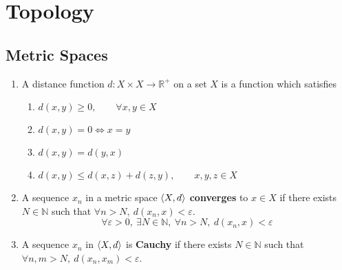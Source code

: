 \chapter{Topology}
\section{Metric Spaces}
\begin{enumerate}
	\item A distance function $d : X \times X \to \mathbb{R}^+$ on a set $X$ is a function which satisfies
	\begin{enumerate}
		\item $d(x,y) \ge 0,\qquad \forall x,y \in X$
		\item $d(x,y) = 0 \iff x=y$
		\item $d(x,y) = d(y,x)$
		\item $d(x,y) \le d(x,z) + d(z,y), \qquad x,y,z \in X$
	\end{enumerate}
	\item A sequence $x_n$ in a metric space $\left\langle X,d \right\rangle$ \textbf{converges} to $x \in X$ if there exists $N \in \mathbb{N}$ such that $\forall n > N,\ d(x_n,x) < \varepsilon$.
	$$ \forall \varepsilon > 0,\ \exists N \in \mathbb{N},\ \forall n > N,\ d(x_n,x) < \varepsilon $$
\item A sequence $x_n$ in $\left\langle X,d \right\rangle$ is \textbf{Cauchy} if there exists $N \in \mathbb{N}$ such that $\forall n,m > N,\ d(x_n,x_m) < \varepsilon$.
\end{enumerate}

